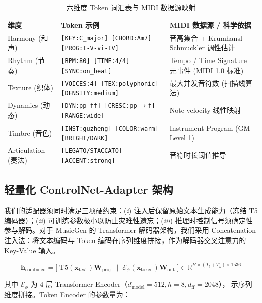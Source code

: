 \documentclass[11pt]{article}
\begin{document}
\begin{table}[t]
\centering\small
\caption{六维度 Token 词汇表与 MIDI 数据源映射}
\label{tab:token_vocab}
\begin{tabularx}{\textwidth}{@{}l >{\raggedright\arraybackslash}X >{\raggedright\arraybackslash}X@{}}
\toprule
\textbf{维度} & \textbf{Token 示例} & \textbf{MIDI 数据源 / 科学依据} \\
\midrule
Harmony (和声) & \texttt{[KEY:C\_major] [CHORD:Am7] [PROG:I-V-vi-IV]} & 音高集合 + Krumhansl-Schmuckler 调性估计~\cite{krumhansl} \\
Rhythm (节奏) & \texttt{[BPM:80] [TIME:4/4] [SYNC:on\_beat]} & Tempo / Time Signature 元事件 (MIDI 1.0 标准) \\
Texture (织体) & \texttt{[VOICES:4] [TEX:polyphonic] [DENSITY:medium]} & 最大并发音符数 (扫描线算法) \\
Dynamics (动态) & \texttt{[DYN:pp--ff] [CRESC:pp$\to$f] [RANGE:wide]} & Note velocity 线性映射~\cite{maestro} \\
Timbre (音色) & \texttt{[INST:guzheng] [COLOR:warm] [BRIGHT/DARK]} & Instrument Program (GM Level 1) \\
Articulation (奏法) & \texttt{[LEGATO/STACCATO] [ACCENT:strong]} & 音符时长阈值推导~\cite{groove} \\
\bottomrule
\end{tabularx}
\end{table}

\subsection{轻量化 ControlNet-Adapter 架构}

我们的适配器须同时满足三项硬约束：(\textit{i}) 注入后保留原始文本生成能力（冻结 T5 编码器）；(\textit{ii}) 可训练参数极小以防止灾难性遗忘；(\textit{iii}) 推理时控制信号须确定性参与解码。对于 MusicGen 的 Transformer 解码器架构，我们采用 Concatenation 注入法：将文本编码与 Token 编码在序列维度拼接，作为解码器交叉注意力的 Key-Value 输入。

\begin{equation}
\mathbf{h}_{\text{combined}} = \big[\;\text{T5}(\mathbf{x}_{\text{text}})\mathbf{W}_{\text{proj}}\;\|\;
\mathcal{E}_{\phi}(\mathbf{x}_{\text{token}})\mathbf{W}_{\text{out}}\;\big]
\in \mathbb{R}^{B\times (T_t+T_k)\times 1536}
\end{equation}

其中 $\mathcal{E}_{\phi}$ 为 4 层 Transformer Encoder（$d_{\text{model}}=512, h=8, d_{\text{ff}}=2048$），\| 表示序列维度拼接。Token Encoder 的参数量为：
\end{document}
